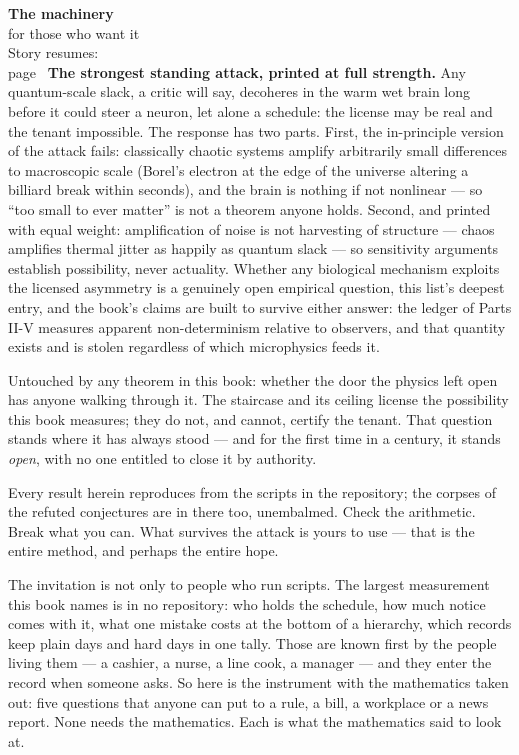 \begin{machinery}{\textbf{The machinery}\\for those who want it\\[3pt]{\color{muted}Story resumes:\\page~\pageref{ch15-s5}}}
\textbf{The strongest standing attack, printed at full strength.} Any
quantum-scale slack, a critic will say, decoheres in the warm wet
brain long before it could steer a neuron, let alone a schedule:
the license may be real and the tenant impossible. The
response has two parts. First, the in-principle version of the attack
fails: classically chaotic systems amplify arbitrarily small
differences to macroscopic scale (Borel's electron at the edge of the
universe altering a billiard break within seconds), and the brain is
nothing if not nonlinear --- so ``too small to ever matter'' is not a
theorem anyone holds. Second, and printed with equal weight:
amplification of noise is not harvesting of structure --- chaos
amplifies thermal jitter as happily as quantum slack --- so sensitivity
arguments establish possibility, never actuality. Whether any
biological mechanism exploits the licensed asymmetry is a genuinely
open empirical question, this list's deepest entry, and the book's
claims are built to survive either answer: the ledger of Parts II-V
measures apparent non-determinism relative to observers, and that
quantity exists and is stolen regardless of which microphysics feeds
it.

\end{machinery}


Untouched by any theorem in this book: whether the door the physics
left open has anyone walking through it. The staircase and its
ceiling license the possibility this book measures; they do not, and
cannot, certify the tenant. That question stands where it has always
stood --- and for the first time in a century, it stands \emph{open}, with
no one entitled to close it by authority.


Every result herein reproduces from the scripts in the repository;
the corpses of the refuted conjectures are in there too, unembalmed.
Check the arithmetic. Break what you can. What survives the attack is
yours to use --- that is the entire method, and perhaps the entire hope.

The invitation is not only to people who run scripts. The largest
measurement this book names is in no repository: who holds the
schedule, how much notice comes with it, what one mistake costs at the
bottom of a hierarchy, which records keep plain days and hard days in
one tally. Those are known first by the people living them --- a
cashier, a nurse, a line cook, a manager --- and they enter the record
when someone asks. So here is the instrument with the mathematics
taken out: five questions that anyone can put to a rule, a bill, a
workplace or a news report. None needs the mathematics. Each is what
the mathematics said to look at.

